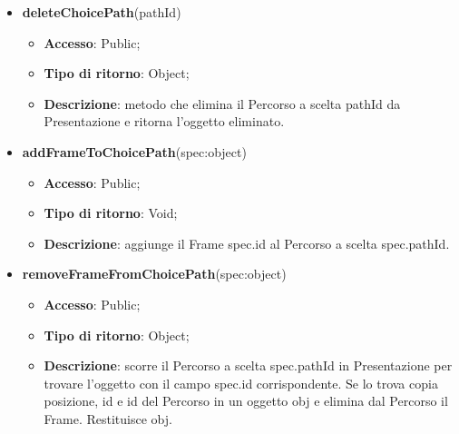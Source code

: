 {\begin{itemize}
\begin{itemize}
				\item \textbf{Tipo di ritorno}: Integer;
				\item \textbf{Descrizione}: metodo che aggiunge un nuovo Percorso a scelta id a Presentazione e ritorna l'id del Percorso.
			\end{itemize}
			\item \textbf{deleteChoicePath}(pathId)
			\begin{itemize}
				\item \textbf{Accesso}: Public;
				\item \textbf{Tipo di ritorno}: Object;
				\item \textbf{Descrizione}: metodo che elimina il Percorso a scelta pathId da Presentazione e ritorna l'oggetto eliminato.
			\end{itemize}
			\item \textbf{addFrameToChoicePath}(spec:object)
			\begin{itemize}
				\item \textbf{Accesso}: Public;
				\item \textbf{Tipo di ritorno}: Void;
				\item \textbf{Descrizione}: aggiunge il Frame spec.id al Percorso a scelta spec.pathId.
			\end{itemize}
			\item \textbf{removeFrameFromChoicePath}(spec:object)
			\begin{itemize}
				\item \textbf{Accesso}: Public;
				\item \textbf{Tipo di ritorno}: Object;
				\item \textbf{Descrizione}: scorre il Percorso a scelta spec.pathId in Presentazione per trovare l’oggetto con il campo spec.id corrispondente. Se lo trova copia posizione, id e id del Percorso in un oggetto obj e elimina dal Percorso\ped{g} il Frame. Restituisce obj.
			\end{itemize}
		\end{itemize}
		
	}
